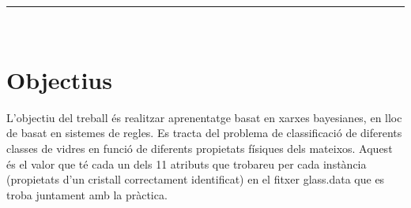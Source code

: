 \documentclass[11pt,a4paper]{article}
\begin{document}
\begin{titlepage}
\begin{center}
\vspace*{0.2in}
\begin{center}
\rule{120mm}{0.1mm}\\
\end{center}
\end{center}
\vspace*{0.2in}
\part*{Objectius}
L'objectiu del treball és realitzar aprenentatge basat en xarxes bayesianes, en lloc de basat en sistemes
de regles. Es tracta del problema de classificació de diferents classes de vidres en funció de diferents
propietats físiques dels mateixos. Aquest és el valor que té cada un dels 11 atributs que trobareu
per cada instància (propietats d'un cristall correctament identificat) en el fitxer glass.data que es troba juntament amb la pràctica.
\end{titlepage}

\renewcommand{\headrulewidth}{0.5pt}
\renewcommand{\footrulewidth}{0.5pt}
\fancypagestyle{plain}{
\fancyhead[L]{}
\fancyhead[C]{}
\fancyhead[R]{\thepage}
\fancyfoot[L]{}
\fancyfoot[C]{}
\fancyfoot[R]{}
\renewcommand{\headrulewidth}{0pt}
\renewcommand{\footrulewidth}{0pt}
}
\pagestyle{fancy}
\vspace*{0.05in}

\tableofcontents
\end{document}
